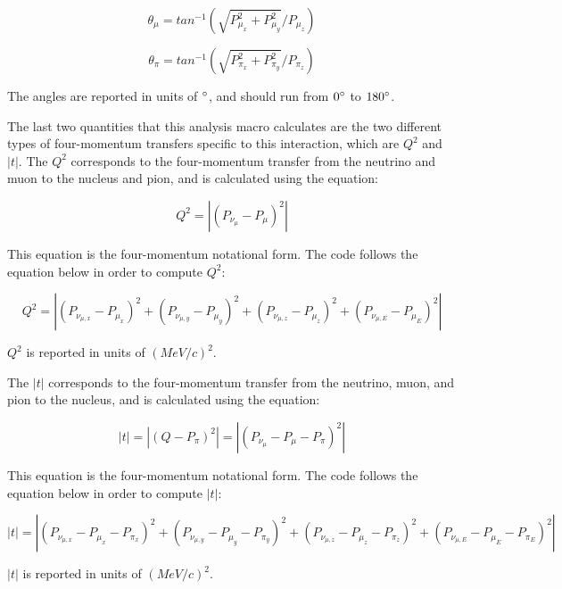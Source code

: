 \documentclass[11pt]{article}
\begin{document}
\begin{equation}
\theta_\mu = tan^{-1}(\sqrt{P_{\mu_x}^2 + P_{\mu_y}^2}/{P_{\mu_z}})
\end{equation}

\begin{equation}
\theta_\pi = tan^{-1}(\sqrt{P_{\pi_x}^2 + P_{\pi_y}^2}/{P_{\pi_z}})
\end{equation}

\noindent
The angles are reported in units of $\degree$, and should run from $0\degree$ to $180\degree$.

The last two quantities that this analysis macro calculates are the two different types of four-momentum transfers specific to this interaction, which are $Q^2$ and $|t|$. The $Q^2$ corresponds to the four-momentum transfer from the neutrino and muon to the nucleus and pion, and is calculated using the equation:

\begin{equation}
Q^2 = |(P_{\nu_\mu} - P_\mu)^2|
\end{equation}

\noindent
This equation is the four-momentum notational form. The code follows the equation below in order to compute $Q^2$:

\begin{equation}
Q^2 = |(P_{\nu_{\mu,x}} - P_{\mu_x})^2 + (P_{\nu_{\mu,y}} - P_{\mu_y})^2 + (P_{\nu_{\mu,z}} - P_{\mu_z})^2 + (P_{\nu_{\mu,E}} - P_{\mu_E})^2|
\end{equation}

\noindent
$Q^2$ is reported in units of $(MeV/c)^2$.

The $|t|$ corresponds to the four-momentum transfer from the neutrino, muon, and pion to the nucleus, and is calculated using the equation:

\begin{equation}
|t| = |(Q - P_\pi)^2| = |(P_{\nu_\mu} - P_\mu - P_\pi)^2|
\end{equation}

\noindent
This equation is the four-momentum notational form. The code follows the equation below in order to compute $|t|$:

\begin{equation}
|t| = |(P_{\nu_{\mu,x}} - P_{\mu_x} - P_{\pi_x})^2 + (P_{\nu_{\mu,y}} - P_{\mu_y} - P_{\pi_y})^2 + (P_{\nu_{\mu,z}} - P_{\mu_z} - P_{\pi_z})^2 + (P_{\nu_{\mu,E}} - P_{\mu_E} - P_{\pi_E})^2|
\end{equation}

\noindent
$|t|$ is reported in units of $(MeV/c)^2$.
\end{document}
